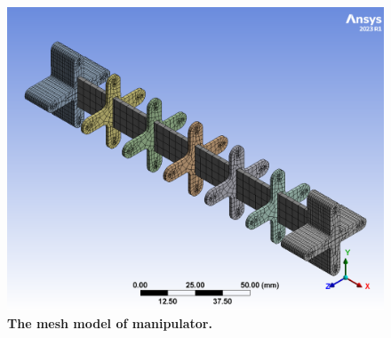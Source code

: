 \begin{figure}[H] %
    \centering
    \captionsetup{labelsep=colon}
    \includegraphics[width=1.0\textwidth]{Image/Design/model_mesh.png} 
    \caption[The mesh model of manipulator]
    {\centering \textbf{The mesh model of manipulator.}}
    \label{fig:mesh_model}
\end{figure}
